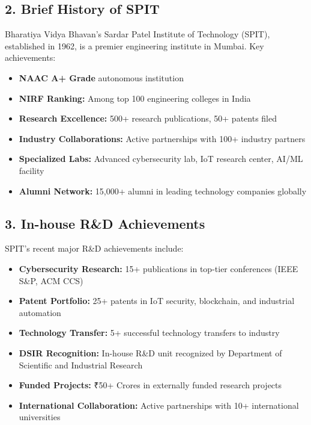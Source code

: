 \documentclass[12pt,a4paper]{article}
\begin{document}
\subsection*{2. Brief History of SPIT}
Bharatiya Vidya Bhavan's Sardar Patel Institute of Technology (SPIT), established in 1962, is a premier engineering institute in Mumbai. Key achievements:
\begin{itemize}
    \item \textbf{NAAC A+ Grade} autonomous institution
    \item \textbf{NIRF Ranking:} Among top 100 engineering colleges in India
    \item \textbf{Research Excellence:} 500+ research publications, 50+ patents filed
    \item \textbf{Industry Collaborations:} Active partnerships with 100+ industry partners
    \item \textbf{Specialized Labs:} Advanced cybersecurity lab, IoT research center, AI/ML facility
    \item \textbf{Alumni Network:} 15,000+ alumni in leading technology companies globally
\end{itemize}

\subsection*{3. In-house R\&D Achievements}
SPIT's recent major R\&D achievements include:
\begin{itemize}
    \item \textbf{Cybersecurity Research:} 15+ publications in top-tier conferences (IEEE S\&P, ACM CCS)
    \item \textbf{Patent Portfolio:} 25+ patents in IoT security, blockchain, and industrial automation
    \item \textbf{Technology Transfer:} 5+ successful technology transfers to industry
    \item \textbf{DSIR Recognition:} In-house R\&D unit recognized by Department of Scientific and Industrial Research
    \item \textbf{Funded Projects:} ₹50+ Crores in externally funded research projects
    \item \textbf{International Collaboration:} Active partnerships with 10+ international universities
\end{itemize}
\end{document}
